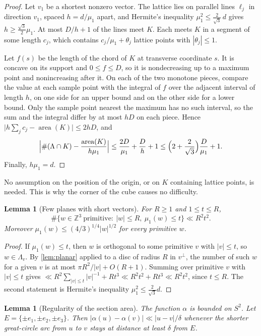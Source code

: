 \documentclass[11pt]{article}
\newtheorem{lemma}[theorem]{Lemma}
\theoremstyle{definition}
\newcommand{\Z}{\mathbb{Z}}
\newcommand{\abs}[1]{\left\lvert #1 \right\rvert}
\begin{document}
\begin{proof}
Let $v_1$ be a shortest nonzero vector. The lattice lies on parallel lines $\ell_j$ in direction $v_1$, spaced $h=d/\mu_1$ apart, and Hermite's inequality $\mu_1^2\le\frac{2}{\sqrt3}\,d$ gives $h\ge\frac{\sqrt3}{2}\mu_1$. At most $D/h+1$ of the lines meet $K$. Each meets $K$ in a segment of some length $c_j$, which contains $c_j/\mu_1+\theta_j$ lattice points with $\abs{\theta_j}\le1$.

Let $f(s)$ be the length of the chord of $K$ at transverse coordinate $s$. It is concave on its support and $0\le f\le D$, so it is nondecreasing up to a maximum point and nonincreasing after it. On each of the two monotone pieces, compare the value at each sample point with the integral of $f$ over the adjacent interval of length $h$, on one side for an upper bound and on the other side for a lower bound. Only the sample point nearest the maximum has no such interval, so the sum and the integral differ by at most $hD$ on each piece. Hence $\bigl|h\sum_jc_j-\operatorname{area}(K)\bigr|\le2hD$, and
\[
\Bigl|\#(\Lambda\cap K)-\frac{\operatorname{area}(K)}{h\mu_1}\Bigr|\le\frac{2D}{\mu_1}+\frac Dh+1\le\Bigl(2+\frac{2}{\sqrt3}\Bigr)\frac{D}{\mu_1}+1.
\]
Finally, $h\mu_1=d$.
\end{proof}

No assumption on the position of the origin, or on $K$ containing lattice points, is needed. This is why the corner of the cube causes no difficulty.

\begin{lemma}[Few planes with short vectors]\label{lem:fewshort}
For $R\ge1$ and $1\le t\le R$,
\[
\#\bigl\{w\in\Z^3\ \text{primitive}:\ \abs w\le R,\ \mu_1(w)\le t\bigr\}\ll R^2t^2.
\]
Moreover $\mu_1(w)\le(4/3)^{1/4}\abs w^{1/2}$ for every primitive $w$.
\end{lemma}

\begin{proof}
If $\mu_1(w)\le t$, then $w$ is orthogonal to some primitive $v$ with $\abs v\le t$, so $w\in\Lambda_v$. By \cref{lem:planar} applied to a disc of radius $R$ in $v^\perp$, the number of such $w$ for a given $v$ is at most $\pi R^2/\abs v+O(R+1)$. Summing over primitive $v$ with $\abs v\le t$ gives $\ll R^2\sum_{\abs v\le t}\abs v^{-1}+Rt^3\ll R^2t^2+Rt^3\ll R^2t^2$, since $t\le R$. The second statement is Hermite's inequality $\mu_1^2\le\frac{2}{\sqrt3}d$.
\end{proof}

\begin{lemma}[Regularity of the section area]\label{lem:regular}
The function $\alpha$ is bounded on $S^2$. Let $E=\{\pm e_1,\pm e_2,\pm e_3\}$. Then $\abs{\alpha(u)-\alpha(v)}\ll\abs{u-v}/\delta$ whenever the shorter great-circle arc from $u$ to $v$ stays at distance at least $\delta$ from $E$.
\end{lemma}
\end{document}
